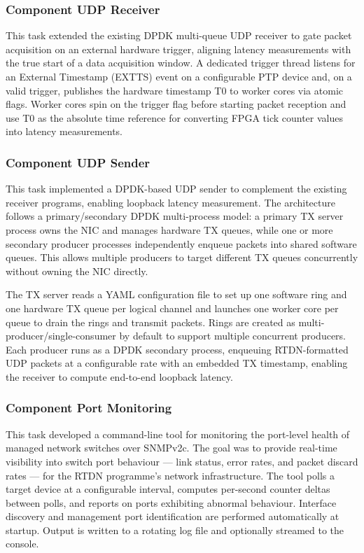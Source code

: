 \documentclass[preprint]{elsarticle}
\begin{document}

\subsubsection{Component UDP Receiver}
This task extended the existing DPDK multi-queue UDP receiver  to gate packet acquisition on an external hardware trigger, aligning latency measurements with the true start of a data acquisition window. A dedicated trigger thread listens for an External Timestamp (EXTTS) event on a configurable PTP device and, on a valid trigger, publishes the hardware timestamp T0 to worker cores via atomic flags. Worker cores spin on the trigger flag before starting packet reception and use T0 as the absolute time reference for converting FPGA tick counter values into latency measurements.

\subsubsection{Component UDP Sender}
This task implemented a DPDK-based UDP sender to complement the existing receiver programs, enabling loopback latency measurement. The architecture follows a primary/secondary DPDK multi-process model: a primary TX server process owns the NIC and manages hardware TX queues, while one or more secondary producer processes independently enqueue packets into shared software queues. This allows multiple producers to target different TX queues concurrently without owning the NIC directly. 

The TX server reads a YAML configuration file to set up one software ring and one hardware TX queue per logical channel and launches one worker core per queue to drain the rings and transmit packets. Rings are created as multi-producer/single-consumer by default to support multiple concurrent producers. Each producer runs as a DPDK secondary process, enqueuing RTDN-formatted UDP packets at a configurable rate with an embedded TX timestamp, enabling the receiver to compute end-to-end loopback latency. 

\subsubsection{Component Port Monitoring}
This task developed a command-line tool for monitoring the port-level health of managed network switches over SNMPv2c. The goal was to provide real-time visibility into switch port behaviour — link status, error rates, and packet discard rates — for the RTDN programme's network infrastructure. The tool polls a target device at a configurable interval, computes per-second counter deltas between polls, and reports on ports exhibiting abnormal behaviour. Interface discovery and management port identification are performed automatically at startup. Output is written to a rotating log file and optionally streamed to the console. 
\end{document}
